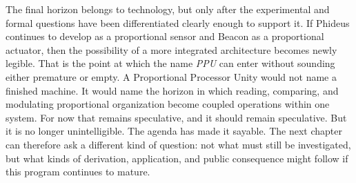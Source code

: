 The final horizon belongs to technology, but only after the experimental and formal questions have been differentiated clearly enough to support it. If Phideus continues to develop as a proportional sensor and Beacon as a proportional actuator, then the possibility of a more integrated architecture becomes newly legible. That is the point at which the name \emph{PPU} can enter without sounding either premature or empty. A Proportional Processor Unity would not name a finished machine. It would name the horizon in which reading, comparing, and modulating proportional organization become coupled operations within one system. For now that remains speculative, and it should remain speculative. But it is no longer unintelligible. The agenda has made it sayable. The next chapter can therefore ask a different kind of question: not what must still be investigated, but what kinds of derivation, application, and public consequence might follow if this program continues to mature.
